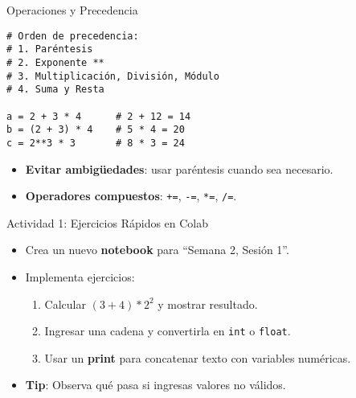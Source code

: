 \documentclass[10pt]{beamer}
\begin{document}
\begin{frame}[fragile]{Operaciones y Precedencia}
\begin{verbatim}
# Orden de precedencia:
# 1. Paréntesis
# 2. Exponente **
# 3. Multiplicación, División, Módulo
# 4. Suma y Resta

a = 2 + 3 * 4      # 2 + 12 = 14
b = (2 + 3) * 4    # 5 * 4 = 20
c = 2**3 * 3       # 8 * 3 = 24
\end{verbatim}
\begin{itemize}
  \item \textbf{Evitar ambigüedades}: usar paréntesis cuando sea necesario.
  \item \textbf{Operadores compuestos}: \texttt{+=}, \texttt{-=}, \texttt{*=}, \texttt{/=}.
\end{itemize}
\end{frame}

\begin{frame}{Actividad 1: Ejercicios Rápidos en Colab}
  \begin{itemize}
    \item Crea un nuevo \textbf{notebook} para “Semana 2, Sesión 1”.
    \item Implementa ejercicios:
      \begin{enumerate}
        \item Calcular \((3+4) * 2^2\) y mostrar resultado.
        \item Ingresar una cadena y convertirla en \texttt{int} o \texttt{float}.
        \item Usar un \textbf{print} para concatenar texto con variables numéricas.
      \end{enumerate}
    \item \textbf{Tip}: Observa qué pasa si ingresas valores no válidos.
  \end{itemize}
\end{frame}

\end{document}
